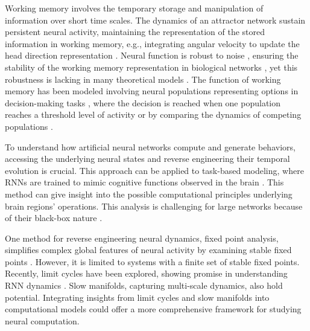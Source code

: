 \documentclass[12pt,letterpaper, onecolumn]{article}
\theoremstyle{definition}
\theoremstyle{remark}
\begin{document}
Working memory involves the temporary storage and manipulation of information over short time scales. The dynamics of an attractor network sustain persistent neural activity, maintaining the representation of the stored information in working memory, e.g., integrating angular velocity to update the head direction representation \citep{barak2013, barak2014, durstewitz2000, wolpert1995, goncalves2014, burak2009, goldman2007, aksay2007, noorman2022, cueva2021a, cueva2021b}. Neural function is robust to noise \citep{faisal2008}, ensuring the stability of the working memory representation \citep{koulakov2002} in biological networks \citep{gallego2020}, yet this robustness is lacking in many theoretical models \citep{renart2003, seeholzer2019, machens2008}.
The function of working memory has been modeled involving neural populations representing options in decision-making tasks \citep{gold2007neural}, where the decision is reached when one population reaches a threshold level of activity or by comparing the dynamics of competing populations \citep{wong2007, wong2008, hocker2024, esnaola2022flexible}.

To understand how artificial neural networks compute and generate behaviors, accessing the underlying neural states and reverse engineering their temporal evolution is crucial. This approach can be applied to task-based modeling, where RNNs are trained to mimic cognitive functions observed in the brain \citep{darshan2022, barak2017recurrent, durstewitz2023reconstructing, yang2019task, yang2019multiple, yang2020artificial, jarne2023b, song2016}. This method can give insight into the possible computational principles underlying brain regions' operations. This analysis is challenging for large networks because of their black-box nature \citep{lipton2018, erasmus2021}.


One method for reverse engineering neural dynamics, fixed point analysis, simplifies complex global features of neural activity by examining stable fixed points \citep{sussillo2013blackbox, sussillo2014, beer2018, maheswaranathan2019universality, driscoll2022, mante2013context}. However, it is limited to systems with a finite set of stable fixed points. Recently, limit cycles have been explored, showing promise in understanding RNN dynamics \citep{pals2024}. Slow manifolds, capturing multi-scale dynamics, also hold potential. Integrating insights from limit cycles and slow manifolds into computational models could offer a more comprehensive framework for studying neural computation.
\end{document}
